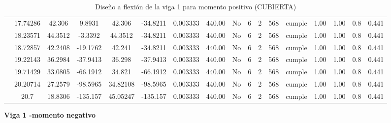 \begin{table}[H]
{\begin{tabular}{|c|c|c|c|c|c|c|c|c|c|c|c|c|c|c|c|c|}
\cline{2-17}    & 17.74286 & 42.306 & 9.8931 & 42.306 & -34.8211 & 0.003333 & 440.00 & No  & 6   & 2   & 568 & \cellcolor[rgb]{ .776,  .937,  .808}cumple & 1.00 & 1.00 & 0.8 & 0.441 \bigstrut\\
\cline{2-17}    & 18.23571 & 44.3512 & -3.3392 & 44.3512 & -34.8211 & 0.003333 & 440.00 & No  & 6   & 2   & 568 & \cellcolor[rgb]{ .776,  .937,  .808}cumple & 1.00 & 1.00 & 0.8 & 0.441 \bigstrut\\
\cline{2-17}    & 18.72857 & 42.2408 & -19.1762 & 42.241 & -34.8211 & 0.003333 & 440.00 & No  & 6   & 2   & 568 & \cellcolor[rgb]{ .776,  .937,  .808}cumple & 1.00 & 1.00 & 0.8 & 0.441 \bigstrut\\
\cline{2-17}    & 19.22143 & 36.2984 & -37.9413 & 36.298 & -37.9413 & 0.003333 & 440.00 & No  & 6   & 2   & 568 & \cellcolor[rgb]{ .776,  .937,  .808}cumple & 1.00 & 1.00 & 0.8 & 0.441 \bigstrut\\
\cline{2-17}    & 19.71429 & 33.0805 & -66.1912 & 34.821 & -66.1912 & 0.003333 & 440.00 & No  & 6   & 2   & 568 & \cellcolor[rgb]{ .776,  .937,  .808}cumple & 1.00 & 1.00 & 0.8 & 0.441 \bigstrut\\
\cline{2-17}    & 20.20714 & 27.2579 & -98.5965 & 34.82108 & -98.5965 & 0.003333 & 440.00 & No  & 6   & 2   & 568 & \cellcolor[rgb]{ .776,  .937,  .808}cumple & 1.00 & 1.00 & 0.8 & 0.441 \bigstrut\\
\cline{2-17}    & 20.7 & 18.8306 & -135.157 & 45.05247 & -135.157 & 0.003333 & 440.00 & No  & 6   & 2   & 568 & \cellcolor[rgb]{ .776,  .937,  .808}cumple & 1.00 & 1.00 & 0.8 & 0.441 \bigstrut\\
\hline
\end{tabular}%

  


  }%
    \caption{Diseño a flexión de la viga 1 para momento positivo (CUBIERTA) }
  \label{tab:F VG1 CUB M+}%
\end{table}%
\newpage
\textbf{Viga 1 -momento negativo}

